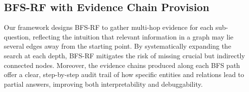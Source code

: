 \documentclass[runningheads]{llncs}
\begin{document}

\subsection{BFS-RF with Evidence Chain Provision}
\label{sec:bfs_reasoning}

Our framework designs BFS-RF to gather multi-hop evidence for each sub-question, reflecting the intuition that relevant information in a graph may lie several edges away from the starting point. By systematically expanding the search at each depth, BFS-RF mitigates the risk of missing crucial but indirectly connected nodes. Moreover, the evidence chains produced along each BFS path offer a clear, step-by-step audit trail of how specific entities and relations lead to partial answers, improving both interpretability and debuggability.
\end{document}
